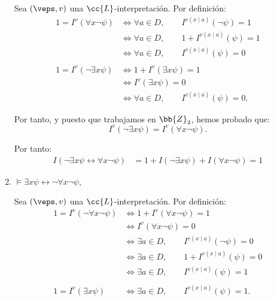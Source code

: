 \begin{ejercicio}
\begin{enumerate}
        Sea $(\veps,v)$ una $\cc{L}$-interpretación. Por definición:
        \begin{align*}
            1 = I^v(\forall x \neg \psi)
            &\iff \forall a\in D,\qquad I^{v(x\mid a)}(\neg \psi) = 1\\
            &\iff \forall a\in D,\qquad 1+I^{v(x\mid a)}(\psi) = 1\\
            &\iff \forall a\in D,\qquad I^{v(x\mid a)}(\psi) = 0\\\\
            1 = I^v(\neg \exists x \psi)
            &\iff 1+I^v(\exists x \psi) = 1\\
            &\iff I^{v}( \exists x \psi) = 0\\
            &\iff \forall a\in D,\qquad I^{v(x\mid a)}(\psi) = 0.
        \end{align*}

        Por tanto, y puesto que trabajamos en $\bb{Z}_2$, hemos probado que:
        \begin{equation*}
            I^v(\neg \exists x \psi) =I^v(\forall x \neg \psi).
        \end{equation*}

        Por tanto:
        \begin{align*}
            I( \neg \exists x \psi \leftrightarrow \forall x \neg \psi)
            &= 1+I(\neg \exists x \psi)+I(\forall x \neg \psi)=1
        \end{align*}
        \item $\models \exists x \psi \leftrightarrow \neg \forall x \neg \psi$,
        
        Sea $(\veps,v)$ una $\cc{L}$-interpretación. Por definición:
        \begin{align*}
            1 = I^v(\neg \forall x \neg \psi)
            &\iff 1+I^v(\forall x \neg \psi) = 1\\
            &\iff I^{v}( \forall x \neg \psi) = 0\\
            &\iff \exists a\in D,\qquad I^{v(x\mid a)}(\neg \psi) = 0\\
            &\iff \exists a\in D,\qquad 1+I^{v(x\mid a)}(\psi) = 0\\
            &\iff \exists a\in D,\qquad I^{v(x\mid a)}(\psi) = 1\\\\
            1 = I^v(\exists x \psi)
            &\iff \exists a\in D,\qquad I^{v(x\mid a)}(\psi) = 1.
        \end{align*}


\end{enumerate}
\end{ejercicio}
